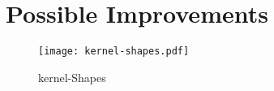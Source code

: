 
\section{Possible Improvements}
\label{sec:possible_improvements}


\begin{figure}[htbp]
	\centering
	\texttt{[image: kernel-shapes.pdf]}
	\caption{kernel-Shapes}
	\label{fig:kernel-shapes}
\end{figure}

